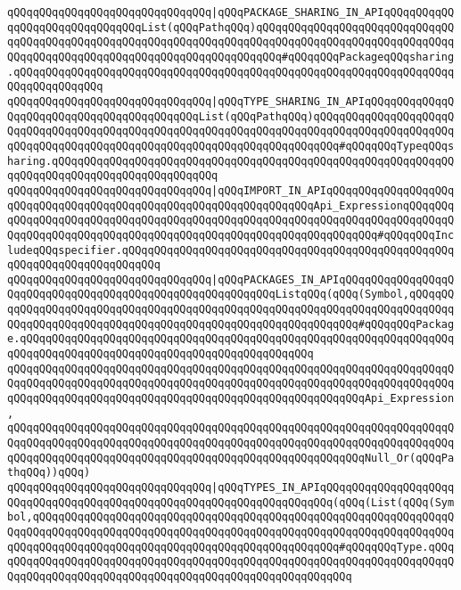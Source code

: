 \verb|qQQqqQQqqQQqqQQqqQQqqQQqqQQqqQQq|\verb#|qQQqPACKAGE_SHARING_IN_APIqQQqqQQqqQQqqQQqqQQqqQQqqQQqqQQqList(qQQqPathqQQq)qQQqqQQqqQQqqQQqqQQqqQQqqQQqqQQqqQQqqQQqqQQqqQQqqQQqqQQqqQQqqQQqqQQqqQQqqQQqqQQqqQQqqQQqqQQqqQQqqQQqqQQqqQQqqQQqqQQqqQQqqQQqqQQqqQQqqQQqqQQqqQQq#\verb|#qQQqqQQqPackageqQQqsharing.qQQqqQQqqQQqqQQqqQQqqQQqqQQqqQQqqQQqqQQqqQQqqQQqqQQqqQQqqQQqqQQqqQQqqQQqqQQqqQQqqQQq|\newline
\verb|qQQqqQQqqQQqqQQqqQQqqQQqqQQqqQQq|\verb#|qQQqTYPE_SHARING_IN_APIqQQqqQQqqQQqqQQqqQQqqQQqqQQqqQQqqQQqqQQqqQQqList(qQQqPathqQQq)qQQqqQQqqQQqqQQqqQQqqQQqqQQqqQQqqQQqqQQqqQQqqQQqqQQqqQQqqQQqqQQqqQQqqQQqqQQqqQQqqQQqqQQqqQQqqQQqqQQqqQQqqQQqqQQqqQQqqQQqqQQqqQQqqQQqqQQqqQQqqQQq#\verb|#qQQqqQQqTypeqQQqsharing.qQQqqQQqqQQqqQQqqQQqqQQqqQQqqQQqqQQqqQQqqQQqqQQqqQQqqQQqqQQqqQQqqQQqqQQqqQQqqQQqqQQqqQQqqQQqqQQq|\newline
\verb|qQQqqQQqqQQqqQQqqQQqqQQqqQQqqQQq|\verb#|qQQqIMPORT_IN_APIqQQqqQQqqQQqqQQqqQQqqQQqqQQqqQQqqQQqqQQqqQQqqQQqqQQqqQQqqQQqqQQqqQQqApi_ExpressionqQQqqQQqqQQqqQQqqQQqqQQqqQQqqQQqqQQqqQQqqQQqqQQqqQQqqQQqqQQqqQQqqQQqqQQqqQQqqQQqqQQqqQQqqQQqqQQqqQQqqQQqqQQqqQQqqQQqqQQqqQQqqQQqqQQqqQQq#\verb|#qQQqqQQqIncludeqQQqspecifier.qQQqqQQqqQQqqQQqqQQqqQQqqQQqqQQqqQQqqQQqqQQqqQQqqQQqqQQqqQQqqQQqqQQqqQQqqQQq|\newline
\newline
\verb|qQQqqQQqqQQqqQQqqQQqqQQqqQQqqQQq|\verb#|qQQqPACKAGES_IN_APIqQQqqQQqqQQqqQQqqQQqqQQqqQQqqQQqqQQqqQQqqQQqqQQqqQQqqQQqqQQqListqQQq(qQQq(Symbol,qQQqqQQqqQQqqQQqqQQqqQQqqQQqqQQqqQQqqQQqqQQqqQQqqQQqqQQqqQQqqQQqqQQqqQQqqQQqqQQqqQQqqQQqqQQqqQQqqQQqqQQqqQQqqQQqqQQqqQQqqQQqqQQqqQQq#\verb|#qQQqqQQqPackage.qQQqqQQqqQQqqQQqqQQqqQQqqQQqqQQqqQQqqQQqqQQqqQQqqQQqqQQqqQQqqQQqqQQqqQQqqQQqqQQqqQQqqQQqqQQqqQQqqQQqqQQqqQQqqQQqqQQq|\newline
\verb|qQQqqQQqqQQqqQQqqQQqqQQqqQQqqQQqqQQqqQQqqQQqqQQqqQQqqQQqqQQqqQQqqQQqqQQqqQQqqQQqqQQqqQQqqQQqqQQqqQQqqQQqqQQqqQQqqQQqqQQqqQQqqQQqqQQqqQQqqQQqqQQqqQQqqQQqqQQqqQQqqQQqqQQqqQQqqQQqqQQqqQQqqQQqqQQqqQQqApi_Expression,|\newline
\verb|qQQqqQQqqQQqqQQqqQQqqQQqqQQqqQQqqQQqqQQqqQQqqQQqqQQqqQQqqQQqqQQqqQQqqQQqqQQqqQQqqQQqqQQqqQQqqQQqqQQqqQQqqQQqqQQqqQQqqQQqqQQqqQQqqQQqqQQqqQQqqQQqqQQqqQQqqQQqqQQqqQQqqQQqqQQqqQQqqQQqqQQqqQQqqQQqqQQqNull_Or(qQQqPathqQQq))qQQq)|\newline
\newline
\verb|qQQqqQQqqQQqqQQqqQQqqQQqqQQqqQQq|\verb#|qQQqTYPES_IN_APIqQQqqQQqqQQqqQQqqQQqqQQqqQQqqQQqqQQqqQQqqQQqqQQqqQQqqQQqqQQqqQQqqQQqqQQq(qQQq(List(qQQq(Symbol,qQQqqQQqqQQqqQQqqQQqqQQqqQQqqQQqqQQqqQQqqQQqqQQqqQQqqQQqqQQqqQQqqQQqqQQqqQQqqQQqqQQqqQQqqQQqqQQqqQQqqQQqqQQqqQQqqQQqqQQqqQQqqQQqqQQqqQQqqQQqqQQqqQQqqQQqqQQqqQQqqQQqqQQqqQQqqQQqqQQqqQQqqQQq#\verb|#qQQqqQQqType.qQQqqQQqqQQqqQQqqQQqqQQqqQQqqQQqqQQqqQQqqQQqqQQqqQQqqQQqqQQqqQQqqQQqqQQqqQQqqQQqqQQqqQQqqQQqqQQqqQQqqQQqqQQqqQQqqQQqqQQqqQQqqQQq|\newline
